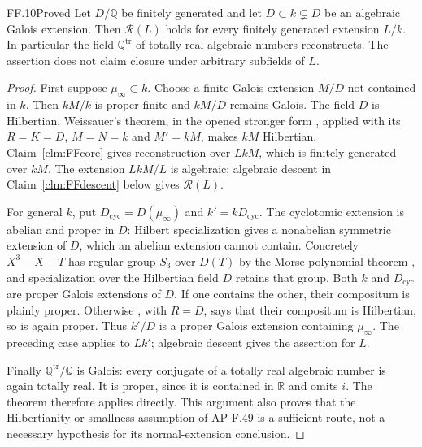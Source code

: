 \begin{claim}{FF.10}{Proved}\label{clm:FFnormal}
Let \(D/\mathbb Q\) be finitely generated and let
\(D\subset k\subsetneq\bar D\) be an algebraic Galois extension.
Then \(\mathcal R(L)\) holds for every finitely generated
extension \(L/k\). In particular the field
\(\mathbb Q^{\mathrm{tr}}\) of totally real algebraic numbers
reconstructs. The assertion does not claim closure under arbitrary
subfields of \(L\).
\end{claim}
\begin{proof}
First suppose \(\mu_\infty\subset k\). Choose a finite Galois
extension \(M/D\) not contained in \(k\). Then \(kM/k\) is
proper finite and \(kM/D\) remains Galois. The field \(D\) is
Hilbertian. Weissauer's theorem, in the opened stronger form
\citet[Corollary~2.3]{FF_JardenRazon2020}, applied with its
\(R=K=D\), \(M=N=k\) and \(M'=kM\), makes \(kM\)
Hilbertian. Claim~\ref{clm:FFcore} gives reconstruction over
\(LkM\), which is finitely generated over \(kM\). The extension
\(LkM/L\) is algebraic; algebraic descent in
Claim~\ref{clm:FFdescent} below gives \(\mathcal R(L)\).

For general \(k\), put \(D_{\mathrm{cyc}}=D(\mu_\infty)\)
and \(k'=kD_{\mathrm{cyc}}\). The cyclotomic extension is
abelian and proper in \(\bar D\): Hilbert specialization gives
a nonabelian symmetric extension of \(D\), which an abelian
extension cannot contain. Concretely \(X^3-X-T\) has regular
group \(S_3\) over \(D(T)\) by the Morse-polynomial theorem
\citep[Theorem~4.4.5]{FF_Serre2007}, and specialization over
the Hilbertian field \(D\) retains that group.
Both \(k\) and \(D_{\mathrm{cyc}}\)
are proper Galois extensions of \(D\). If one contains the
other, their compositum is plainly proper. Otherwise
\citet[Theorem~2.2]{FF_JardenRazon2020}, with \(R=D\), says
that their compositum is Hilbertian, so is again proper.
Thus \(k'/D\) is a proper Galois extension containing
\(\mu_\infty\). The preceding case applies to \(Lk'\);
algebraic descent gives the assertion for \(L\).

Finally \(\mathbb Q^{\mathrm{tr}}/\mathbb Q\) is Galois:
every conjugate of a totally real algebraic number is again
totally real. It is proper, since it is contained in \(\mathbb R\)
and omits \(i\). The theorem therefore applies directly.
This argument also proves that the Hilbertianity or smallness
assumption of AP-F.49 is a sufficient route, not a necessary
hypothesis for its normal-extension conclusion.
\end{proof}

